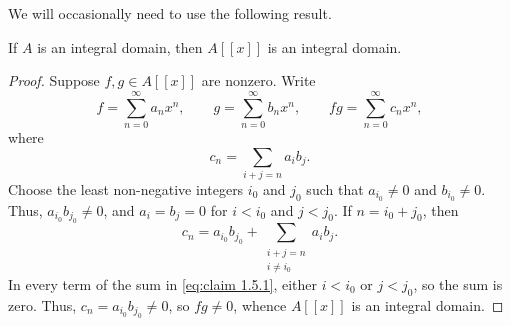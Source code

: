 We will occasionally need to use the following result.

\begin{claim}
\label{claim:1.5.1}
If \(A\) is an integral domain, then \(A[[x]]\) is an integral domain.
\end{claim}

\begin{proof}
Suppose \(f,g\in A[[x]]\) are nonzero.
Write
\begin{equation*}
f = \sum_{n=0}^\infty a_n x^n,
\qquad
g = \sum_{n=0}^\infty b_n x^n,
\qquad
f g = \sum_{n=0}^\infty c_n x^n,
\end{equation*}
where
\begin{equation*}
c_n = \sum_{i + j = n} a_i b_j.
\end{equation*}
Choose the least non-negative integers \(i_0\) and \(j_0\) such that \(a_{i_0} \neq 0\) and \(b_{i_0} \neq 0\).
Thus, \(a_{i_0} b_{j_0} \neq 0\), and \(a_i = b_j = 0\) for \(i < i_0\) and \(j < j_0\).
If \(n = i_0 + j_0\), then
\begin{equation}
\label{eq:claim 1.5.1}
c_n = a_{i_0} b_{j_0} + \sum_{\substack{i + j = n \\ i \neq i_0}} a_i b_j.
\end{equation}
In every term of the sum in \eqref{eq:claim 1.5.1}, either \(i < i_0\) or \(j < j_0\), so the sum is zero. Thus, \(c_n = a_{i_0} b_{j_0} \neq 0\), so \(f g \neq 0\), whence \(A[[x]]\) is an integral domain.
\end{proof}

